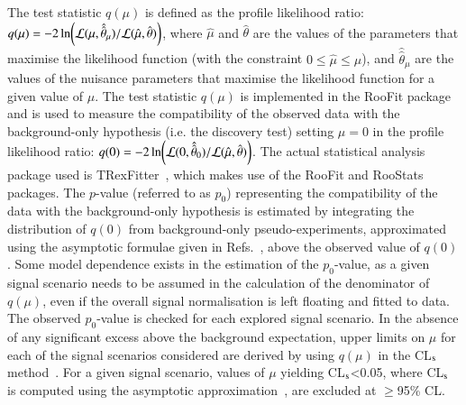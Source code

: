 The test statistic $q(\mu)$ is defined as the profile likelihood ratio: 
$q(\mu) = -2\ln({\cal L}(\mu,\hat{\hat{\theta}}_\mu)/{\cal L}(\hat{\mu},\hat{\theta}))$,
where $\hat{\mu}$ and $\hat{\theta}$ are the values of the parameters that
maximise the likelihood function (with the constraint $0\leq \hat{\mu} \leq \mu$), and $\hat{\hat{\theta}}_\mu$ are the values of the
nuisance parameters that maximise the likelihood function for a given value of $\mu$. 
The test statistic $q(\mu)$ is implemented in the {\sc RooFit} package~\cite{Verkerke:2003ir,RooFitManual} and
is used to measure the compatibility of the observed data with the background-only hypothesis (i.e. the discovery test)  
setting $\mu=0$ in the profile likelihood ratio: $q(0) = -2\ln({\cal L}(0,\hat{\hat{\theta}}_0)/{\cal L}(\hat{\mu},\hat{\theta}))$.
The actual statistical analysis package used is {\sc TRexFitter}~\cite{TRexFitterTwiki}, which makes use of the {\sc RooFit} and {\sc RooStats} packages.
The $p$-value (referred to as $p_0$) representing the compatibility of the data with the background-only hypothesis is estimated by integrating
the distribution of $q(0)$ from background-only pseudo-experiments, approximated using the asymptotic formulae given in Refs.~\cite{Cowan:2010js,ErratumCowan:2010js}, 
above the observed value of $q(0)$. Some model dependence exists
in the estimation of the $p_0$-value, as a given signal scenario needs to be assumed in the calculation of the denominator of $q(\mu)$, even 
if the overall signal normalisation is left floating and fitted to data. The observed $p_0$-value is checked for each explored signal scenario.
In the absence of any significant excess above the background expectation, upper limits on $\mu$ for each of the 
signal scenarios considered are derived by using $q(\mu)$ in the CL$_{\rm{s}}$ method~\cite{Junk:1999kv,Read:2002hq}.
For a given signal scenario, values of $\mu$ yielding CL$_{\rm{s}}$<0.05,  
where CL$_{\rm{s}}$ is computed using the asymptotic  approximation~\cite{Cowan:2010js}, are excluded at $\geq$95\% CL.


